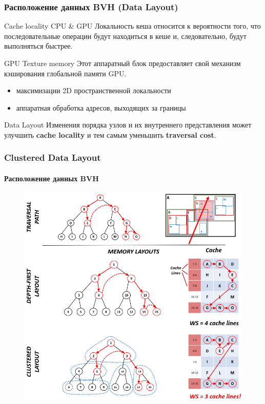 \documentclass{beamer}
\begin{document}
\begin{frame}
    \frametitle{Расположение данных BVH (Data Layout)}
    \begin{block}{Cache locality CPU \& GPU}
        Локальность кеша относится к вероятности того,
        что последовательные операции будут находиться в кеше и,
        следовательно, будут выполняться быстрее.
    \end{block}
    \begin{block}{GPU Texture memory}
        Этот аппаратный блок предоставляет свой механизм кэширования глобальной памяти GPU.
        \begin{itemize}
            \item
                максимизации 2D пространственной локальности
            \item
                аппаратная обработка адресов, выходящих за границы
        \end{itemize}
    \end{block}
    \begin{block}{Data Layout}
        Изменения порядка узлов и их внутреннего представления может улучшить \textbf{cache locality}
        и тем самым уменьшить \textbf{traversal cost}.
    \end{block}
\end{frame}

\begin{frame}[t]
    \frametitle{Clustered Data Layout}
    \framesubtitle{Расположение данных BVH}
    \begin{figure}
        \includegraphics[height=0.75\textheight]{res/clusters.png}
    \end{figure}
\end{frame}
\end{document}
